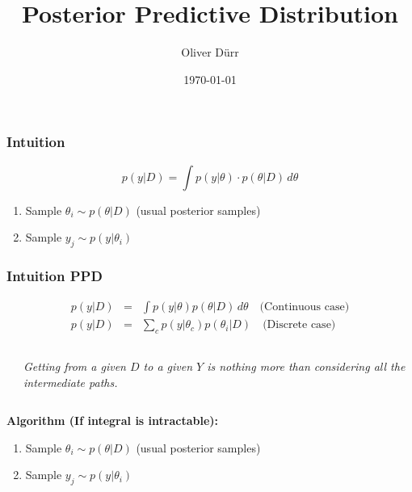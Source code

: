 \documentclass{beamer}
\title{Posterior Predictive Distribution}
\author{Oliver Dürr}
\date{\today}
\begin{document}
 
\frame{\titlepage}

\begin{frame}
\frametitle{Intuition}

\[
p(y|D) = \int p(y|\theta) \cdot p(\theta|D) \, d\theta 
\]

\begin{enumerate}
    \item Sample \( \theta_i \sim p(\theta|D) \) (usual posterior samples)
    \item Sample \( y_j \sim p(y|\theta_i) \)
\end{enumerate}
\end{frame}

\begin{frame}
\frametitle{Intuition PPD}

\begin{flushleft}
\begin{scriptsize}
\begin{eqnarray*}
p(y|D) &=& \int p(y|\theta) p(\theta|D) \, d\theta \quad \text{(Continuous case)} \\
p(y|D) &=& \sum_{c} p(y|\theta_c) p(\theta_i|D) \quad \text{(Discrete case)} 
\end{eqnarray*}
\end{scriptsize}
\end{flushleft}

\begin{columns}
    \begin{column}{0.7\textwidth}
        \begin{center}
        \end{center}
    \end{column} 
    \begin{column}{0.3\textwidth}
        \begin{flushright}
        \textit{Getting from a given $D$ to a given $Y$ is nothing more than considering all
        the intermediate paths.}
        \end{flushright}
    \end{column}
\end{columns}
\textbf{Algorithm (If integral is intractable):}
\begin{enumerate}
    \item Sample \( \theta_i \sim p(\theta|D) \) (usual posterior samples)
    \item Sample \( y_j \sim p(y|\theta_i) \)
\end{enumerate}
\end{frame}
\end{document}
